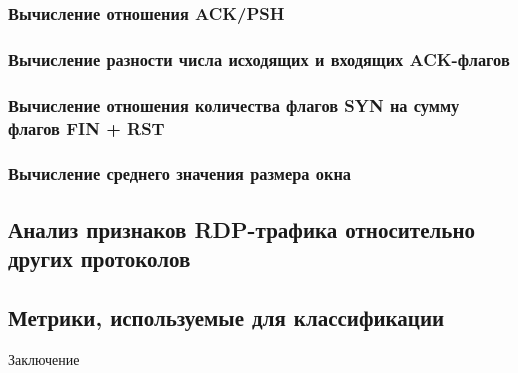 \documentclass[bachelor, och, coursework]{SCWorks}
\begin{document}
\subsubsection{Вычисление отношения ACK/PSH}
\subsubsection{Вычисление разности числа исходящих и входящих ACK-флагов}


\subsubsection{Вычисление отношения количества флагов SYN на сумму флагов FIN + RST}
\subsubsection{Вычисление среднего значения размера окна}



\subsection{Анализ признаков RDP-трафика относительно других протоколов}

\subsection{Метрики, используемые для классификации}


\conclusion
  
Заключение
\end{document}
